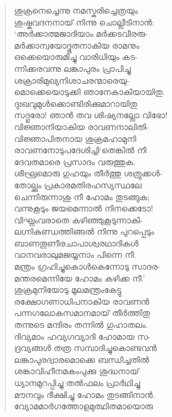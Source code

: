 \begin{verse}
ശുക്രനെച്ചെന്നു നമസ്കരിച്ചെത്രയും\\
ശുഷ്കവദനനായ് നിന്നു ചൊല്ലീടിനാന്‍:\\
‘അര്‍ക്കാത്മജാദിയാം മര്‍ക്കടവീരരു-\\
മര്‍ക്കാന്വയോദ്ഭൂതനാകിയ രാമനും\\
ഒക്കെയൊരുമിച്ചു വാരിധിയും കട-\\
ന്നിക്കരവന്നു ലങ്കാപുരം പ്രാപിച്ചു\\
ശക്രാരിമുഖ്യനിശാചരന്മാരെയു-\\
മൊക്കെയൊടുക്കി ഞാനേകാകിയായിതു.\\
ദുഃഖവുമുള്‍ക്കൊണ്ടിരിക്കുമാറായിതു\\
സദ്ഗുരോ! ഞാന്‍ തവ ശിഷ്യനല്ലോ വിഭോ!\\
വിജ്ഞാനിയാകിയ രാവണനാലിതി-\\
വിജ്ഞാപിതനായ ശുക്രമഹാമുനി\\
രാവണനോടുപദേശിച്ചി‘തെങ്കില്‍ നീ\\
ദേവതമാരെ പ്രസാദം വരുത്തുക.\\
ശീഘ്രമൊരു ഗുഹയും തീര്‍ത്തു ശത്രുക്കള്‍-\\
തോല്ക്കും പ്രകാരമതിരഹസ്യസ്ഥലേ\\
ചെന്നിരുന്നാശു നീ ഹോമം തുടങ്ങുക;\\
വന്നുകൂടും ജയമെന്നാല്‍ നിനക്കെടോ!\\
വിഘ്നംവരാതെ കഴിഞ്ഞുകൂടുന്നാകി-\\
ലഗ്നികുണ്ഡത്തിങ്ങല്‍ നിന്നു പുറപ്പെടും\\
ബാണതൂണീരചാപാശ്വരഥാദികള്‍\\
വാനവരാലുമജയ്യനാം പിന്നെ നീ.\\
മന്ത്രം ഗ്രഹിച്ചുകൊള്‍കെന്നോടു സാദര-\\
മന്തരമെന്നിയേ ഹോമം കഴിക്ക നീ.’\\
ശുക്രമുനിയോടു മൂലമന്ത്രംകേട്ടു\\
രക്ഷോഗണാധിപനാകിയ രാവണന്‍\\
പന്നഗലോകസമാനമായ് തീര്‍ത്തിതു\\
തന്നുടെ മന്ദിരം തന്നില്‍ ഗുഹാതലം.\\
ദിവ്യമാം ഹവ്യഗവ്യാദി ഹോമായ സ-\\
ദ്രവ്യങ്ങള്‍ തത്ര സമ്പാദിച്ചുകൊണ്ടവന്‍\\
ലങ്കാപുരദ്വാരമൊക്കെ ബന്ധിച്ചതില്‍\\
ശങ്കാവിഹീനമകംപുക്കു ശുദ്ധനായ്\\
ധ്യാനമുറപ്പിച്ചു തല്‍ഫലം പ്രാര്‍ഥിച്ചു\\
മൗനവും ദീക്ഷിച്ചു ഹോമം തുടങ്ങിനാന്‍.\\
വ്യോമമാര്‍ഗത്തോളമുത്ഥിതമായൊരു\\

\end{verse}
